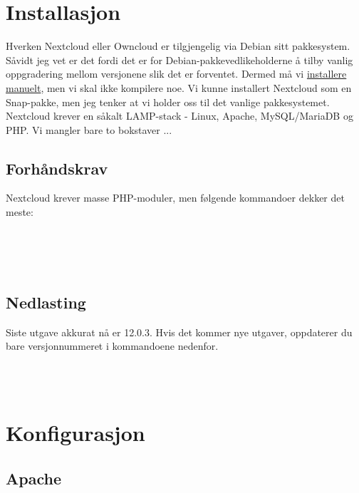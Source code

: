 \section{Installasjon}

Hverken Nextcloud eller Owncloud er tilgjengelig via Debian sitt 
pakkesystem. Såvidt jeg vet er det fordi det er 
for Debian-pakkevedlikeholderne å tilby vanlig oppgradering 
mellom versjonene slik det er forventet. Dermed må vi 
\href{https://docs.nextcloud.com/server/12/admin_manual/installation/source_installation.html}{installere manuelt}, 
men vi skal ikke kompilere noe. Vi kunne installert
Nextcloud som en Snap-pakke, men jeg tenker at vi holder oss til
det vanlige pakkesystemet. Nextcloud krever en såkalt LAMP-stack - 
Linux, Apache, MySQL/MariaDB og PHP. Vi mangler bare to bokstaver ...

\subsection*{Forhåndskrav}

Nextcloud krever masse PHP-moduler, men følgende kommandoer dekker det meste:

\\
\\
\\

\subsection*{Nedlasting}

Siste utgave akkurat nå er 12.0.3. Hvis det kommer nye utgaver, oppdaterer du bare
versjonnummeret i kommandoene nedenfor.

\\
\\

\section{Konfigurasjon}

\subsection{Apache}

